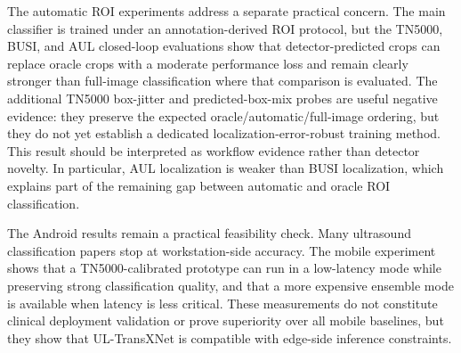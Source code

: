 The automatic ROI experiments address a separate practical concern. The main classifier is trained under an annotation-derived ROI protocol, but the TN5000, BUSI, and AUL closed-loop evaluations show that detector-predicted crops can replace oracle crops with a moderate performance loss and remain clearly stronger than full-image classification where that comparison is evaluated. The additional TN5000 box-jitter and predicted-box-mix probes are useful negative evidence: they preserve the expected oracle/automatic/full-image ordering, but they do not yet establish a dedicated localization-error-robust training method. This result should be interpreted as workflow evidence rather than detector novelty. In particular, AUL localization is weaker than BUSI localization, which explains part of the remaining gap between automatic and oracle ROI classification.

The Android results remain a practical feasibility check. Many ultrasound classification papers stop at workstation-side accuracy. The mobile experiment shows that a TN5000-calibrated prototype can run in a low-latency mode while preserving strong classification quality, and that a more expensive ensemble mode is available when latency is less critical. These measurements do not constitute clinical deployment validation or prove superiority over all mobile baselines, but they show that UL-TransXNet is compatible with edge-side inference constraints.


